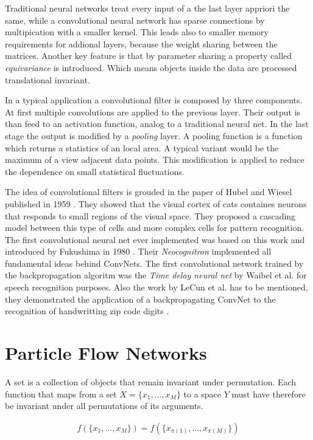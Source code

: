 \documentclass[12pt, a4paper]{thesis}
\begin{document}
Traditional neural networks treat every input of a the last layer appriori the
same, while a convolutional neural network has sparse connections by
multipication with a smaller kernel. This leads also to smaller memory
requirements for addional layers, because the weight sharing between the matrices.
Another key feature is that by parameter sharing a property called
\emph{equivariance} is introduced.  Which means objects inside the data are processed
translational invariant.

In a typical application a convolutional filter is composed by three components.
At first multiple convolutions are applied to the previous layer. Their output
is than feed to an activation function, analog to a traditional neural net.  In
the last stage the output is modified by a \emph{pooling} layer. A pooling function
is a function which returns a statistics of an local area. A typical variant
would be the maximum of a view adjacent data points. This modification is
applied to reduce the dependence on small statistical fluctuations.

The idea of convolutional filters is grouded in the paper of Hubel and Wiesel
published in 1959 \cite{hubel59}. They showed that the visual cortex of cats
containes neurons that responds to small regions of the visual space. They
proposed a cascading model between this type of cells and more complex cells for
pattern recognition. The first convolutional neural net ever implemented was
based on this work and introduced by Fukushima in 1980 \cite{neocognitron}. Their
\emph{Neocognitron} implemented all fundamental ideas behind ConvNets.  The first
convolutional network trained by the backpropagation algoritm was the \emph{Time
delay neural net} by Waibel et al. \cite{hampshire89,waibel90} for speech
recognition purposes. Also the work by LeCun et al. has to be mentioned, they
demonstrated the application of a backpropagating ConvNet to the recognition of
handwritting zip code digits \cite{lecun89}.

\section{Particle Flow Networks}
\label{sec:orgde973b7}

A set is a collection of objects that remain invariant under permutation. Each function that maps from a set \(X = \{x_1, ... , x_M \}\) to a space \(Y\) must have
therefore be invariant under all permutations of its arguments.

\begin{align}
f(\{x_1, ... , x_M \}) = f(\{x_{\pi(1)}, ... , x_{\pi(M)}\})
\end{align}
\end{document}
